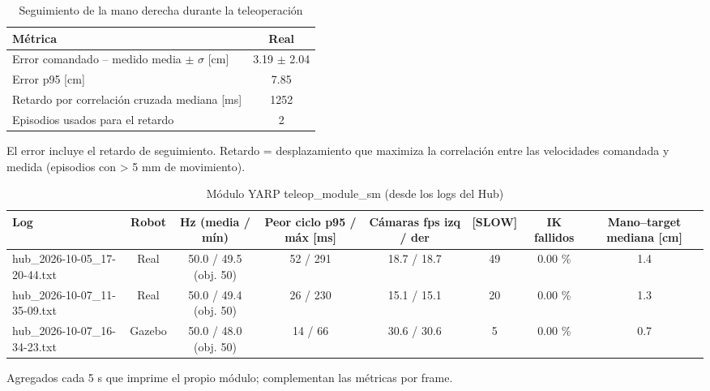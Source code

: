 \begin{table}[htbp]
\centering\small
\caption{Seguimiento de la mano derecha durante la teleoperación}
\begin{tabular}{lc}
\toprule
Métrica & Real \\
\midrule
Error comandado -- medido media $\pm$ $\sigma$ [cm] & 3.19 $\pm$ 2.04 \\
Error p95 [cm] & 7.85 \\
Retardo por correlación cruzada mediana [ms] & 1252 \\
Episodios usados para el retardo & 2 \\
\bottomrule
\end{tabular}
\par\footnotesize El error incluye el retardo de seguimiento. Retardo = desplazamiento que maximiza la correlación entre las velocidades comandada y medida (episodios con > 5 mm de movimiento).
\end{table}

\begin{table}[htbp]
\centering\small
\caption{Módulo YARP teleop\_module\_sm (desde los logs del Hub)}
\begin{tabular}{lccccccc}
\toprule
Log & Robot & Hz (media / mín) & Peor ciclo p95 / máx [ms] & Cámaras fps izq / der & [SLOW] & IK fallidos & Mano--target mediana [cm] \\
\midrule
hub\_2026-10-05\_17-20-44.txt & Real & 50.0 / 49.5 (obj. 50) & 52 / 291 & 18.7 / 18.7 & 49 & 0.00 \% & 1.4 \\
hub\_2026-10-07\_11-35-09.txt & Real & 50.0 / 49.4 (obj. 50) & 26 / 230 & 15.1 / 15.1 & 20 & 0.00 \% & 1.3 \\
hub\_2026-10-07\_16-34-23.txt & Gazebo & 50.0 / 48.0 (obj. 50) & 14 / 66 & 30.6 / 30.6 & 5 & 0.00 \% & 0.7 \\
\bottomrule
\end{tabular}
\par\footnotesize Agregados cada 5 s que imprime el propio módulo; complementan las métricas por frame.
\end{table}
